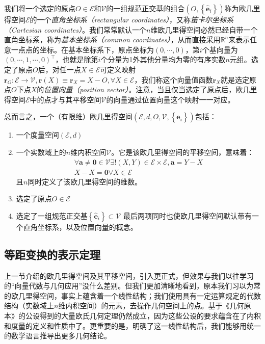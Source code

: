 \documentclass[main.tex]{subfiles}
\begin{document}
我们将一个选定的原点$O\in\mathcal{E}$和$\mathcal{V}$的一组规范正交基的组合$\left(O,\left\{\mathbf{\hat{e}}_i\right\}\right)$称为欧几里得空间$\mathcal{E}$的一个\emph{直角坐标系（rectangular coordinates）}，又称\emph{笛卡尔坐标系（Cartesian coordinates）}。我们常常默认一个$n$维欧几里得空间必然已经自带一个直角坐标系，称为\emph{基本坐标系（common coordinates）}，从而直接采用$\mathbb{R}^n$来表示任意一点点的坐标。在基本坐标系下，原点坐标为$\left(0,\cdots,0\right)$，第$i$个基向量为$\left(0,\cdots,1,\cdots,0\right)^\intercal$，也就是除第$i$个分量为1外其他分量均为零的有序实数$n$元组。选定了原点$O$后，对任一点$X\in\mathcal{E}$可定义映射$\mathbf{r}_O:\mathcal{E}\rightarrow\mathcal{V},\mathbf{r}\left(X\right)\equiv\mathbf{r}_X=X-O,\forall X\in\mathcal{E}$，我们称这个向量值函数$\mathbf{r}_X$就是选定原点$O$下点$X$的\emph{位置向量（position vector）}。注意，当且仅当选定了原点后，欧几里得空间$\mathcal{E}$中的点才与其平移空间$\mathcal{V}$的向量通过位置向量这个映射一一对应。

总而言之，一个（有限维）欧几里得空间$\left(\mathcal{E},d,O,\mathcal{V},\left\{\mathbf{\hat{e}}_i\right\}\right)$包括：
\begin{enumerate}
    \item 一个度量空间$\left(\mathcal{E},d\right)$
    \item 一个实数域上的$n$维内积空间$\mathcal{V}$。它是该欧几里得空间的平移空间，意味着：
          \begin{align*}
              \forall\mathbf{a}\neq\mathbf{0}\in\mathcal{V}\exists!\left(X,Y\right)\in\mathcal{E}\times\mathcal{E},\mathbf{a}=Y-X \\
              X-X=\mathbf{0}\forall X\in\mathcal{E}
          \end{align*}
          且$n$同时定义了该欧几里得空间的维数。
    \item 选定了原点$O\in\mathcal{E}$
    \item 选定了一组规范正交基$\left\{\mathbf{\hat{e}}_i\right\}\subset\mathcal{V}$
          最后两项同时也使欧几里得空间默认带有一个直角坐标系，以及位置向量的概念。
\end{enumerate}

\subsection{等距变换的表示定理}
上一节介绍的欧几里得空间及其平移空间，引入更正式，但效果与我们以往学习的“向量代数与几何应用”\cite[\S 6]{华工高数2009上}\cite[\S 3]{周胜林2012线性代数}没什么差别。但我们更加清晰地看到，原本我们习以为常的欧几里得空间，事实上蕴含着一个线性结构；我们使用具有一定运算规定的代数结构（实数域上$n$维内积空间）的元素，去操作几何空间上的点。基于《几何原本》的公设得到的大量欧氏几何定理仍然成立，因为这些公设的要求蕴含在了内积和度量的定义和性质中了\cite{Audin2002}。更重要的是，明确了这一线性结构后，我们能够用统一的数学语言推导出更多几何结论\cite{Berger1987}。
\end{document}

